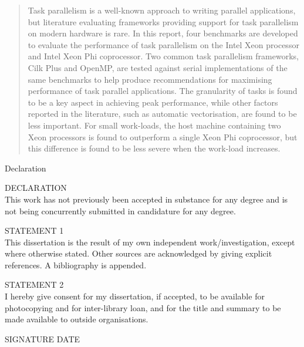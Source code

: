 \documentclass{report}
\begin{document}
\newpage

\onehalfspacing
\begin{abstract}
Task parallelism is a well-known approach to writing parallel applications, but literature evaluating frameworks providing support for task parallelism on modern hardware is rare. In this report, four benchmarks are developed to evaluate the performance of task parallelism on the Intel Xeon processor and Intel Xeon Phi coprocessor. Two common task parallelism frameworks, Cilk Plus and OpenMP, are tested against serial implementations of the same benchmarks to help produce recommendations for maximising performance of task parallel applications. The granularity of tasks is found to be a key aspect in achieving peak performance, while other factors reported in the literature, such as automatic vectorisation, are found to be less important. For small work-loads, the host machine containing two Xeon processors is found to outperform a single Xeon Phi coprocessor, but this difference is found to be less severe when the work-load increases.
\end{abstract}

\newpage
\begin{center}
{\huge Declaration}
\end{center}
\hfill
\newline
\newline

\noindent
DECLARATION\\
This work has not previously been accepted in substance for any degree and is not being concurrently submitted in candidature for any degree.
\newline
\newline
\newline

\noindent
STATEMENT 1\\
This dissertation is the result of my own independent work/investigation, except where otherwise stated. Other sources are acknowledged by giving explicit references. A bibliography is appended.
\newline
\newline
\newline

\noindent
STATEMENT 2\\
I hereby give consent for my dissertation, if accepted, to be available for photocopying and for inter-library loan, and for the title and summary to be made available to outside organisations.
\newline
\newline
\newline
\newline
\begin{center}
SIGNATURE \hspace{20em} DATE
\end{center}
\end{document}
